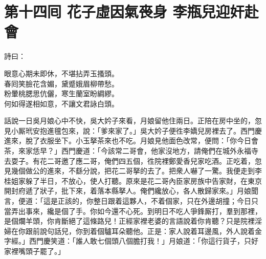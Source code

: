 
\chapter*{第十四囘 花子虛因氣䘮身 李瓶兒迎奸赴會}


詩曰：

\begin{myquote}
眼意心期未即休，不堪拈弄玉搔頭。\\春囘笑臉花含媚，黛蹙娥眉柳帶愁。\\粉暈桃腮思伉儷，寒生蘭室盼綢繆。\\何如得遂相如意，不讓文君詠白頭。
\end{myquote}

話說一日吳月娘心中不快，吳大妗子來看，月娘留他住兩日。正陪在房中坐的，忽見小厮玳安抱進氊包來，說：「爹來家了。」吳大妗子便徃李嬌兒房裡去了。西門慶進來，脫了衣服坐下。小玉拏茶來也不吃。月娘見他面色改常，便問：「你今日會茶，來家恁早？」西門慶道：「今該常二哥會，他家沒地方，請俺們在城外永福寺去耍子。有花二哥邀了應二哥，俺們四五個，徃院裡鄭愛香兒家吃酒。正吃着，忽見幾個做公的進來，不繇分說，把花二哥拏的去了。把衆人嚇了一驚。我便走到李桂姐家躲了半日，不放心，使人打聽。原來是花二哥內臣家房族中告家財，在東京開封府遞了狀子，批下來，着落本縣拏人。俺們纔放心，各人散歸家來。」月娘聞言，便道：「這是正該的，你整日跟着這夥人，不着個家，只在外邊胡撞；今日只當弄出事來，纔是個了手。你如今還不心死。到明日不吃人爭鋒厮打，羣到那裡，是個爛羊頭，你肯斷絕了這條路兒！正經家裡老婆的言語說着你肯聽？只是院裡淫婦在你跟前說句話兒，你到着個驢耳朵聽他。正是：家人說着耳邊風，外人說着金字經。」西門慶笑道：「誰人敢七個頭八個膽打我！」{}月娘道：「你這行貨子，只好家裡嘴頭子罷了。」

